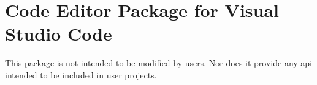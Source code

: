 \chapter{Code Editor Package for Visual Studio Code}
\hypertarget{md__hey_tea_9_2_library_2_package_cache_2com_8unity_8ide_8vscode_0d1_82_85_2_documentation_0i_2_r_e_a_d_m_e}{}\label{md__hey_tea_9_2_library_2_package_cache_2com_8unity_8ide_8vscode_0d1_82_85_2_documentation_0i_2_r_e_a_d_m_e}
\label{md__hey_tea_9_2_library_2_package_cache_2com_8unity_8ide_8vscode_0d1_82_85_2_documentation_0i_2_r_e_a_d_m_e_autotoc_md1028}%
%
 This package is not intended to be modified by users. Nor does it provide any api intended to be included in user projects. 